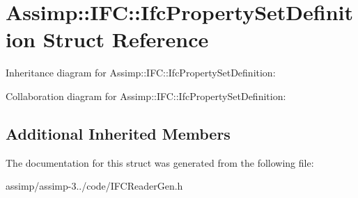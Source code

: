\hypertarget{struct_assimp_1_1_i_f_c_1_1_ifc_property_set_definition}{\section{Assimp\+:\+:I\+F\+C\+:\+:Ifc\+Property\+Set\+Definition Struct Reference}
\label{struct_assimp_1_1_i_f_c_1_1_ifc_property_set_definition}
}


Inheritance diagram for Assimp\+:\+:I\+F\+C\+:\+:Ifc\+Property\+Set\+Definition\+:


Collaboration diagram for Assimp\+:\+:I\+F\+C\+:\+:Ifc\+Property\+Set\+Definition\+:
\subsection*{Additional Inherited Members}


The documentation for this struct was generated from the following file\+:\begin{DoxyCompactItemize}
\item 
assimp/assimp-\/3../code/I\+F\+C\+Reader\+Gen.\+h\end{DoxyCompactItemize}
